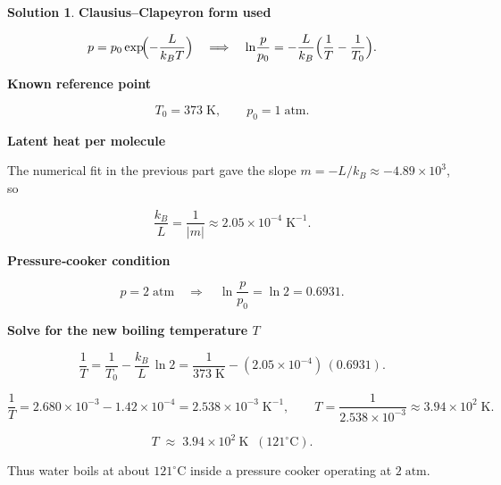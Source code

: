 \documentclass[12pt]{article}
\theoremstyle{definition} %
\newtheorem{solution}{Solution}
\theoremstyle{plain} %
\begin{document}
                      \begin{solution}
                        \textbf{Clausius–Clapeyron form used}
                        
                        \[
                        p = p_0 \exp\!\Bigl(-\frac{L}{k_B T}\Bigr)
                        \quad\Longrightarrow\quad
                        \ln\!\frac{p}{p_0} = -\frac{L}{k_B}\Bigl(\frac{1}{T}-\frac{1}{T_0}\Bigr).
                        \]
                        
                        \textbf{Known reference point}
                        
                        \[
                        T_0 = 373\;\text{K}, \qquad p_0 = 1\;\text{atm}.
                        \]
                        
                        \textbf{Latent heat per molecule}
                        
                        The numerical fit in the previous part gave the slope  
                        \(m = -L/k_B \approx -4.89\times10^{3}\),  
                        so
                        
                        \[
                        \frac{k_B}{L} = \frac{1}{|m|} \approx 2.05\times10^{-4}\;\text{K}^{-1}.
                        \]
                        
                        \textbf{Pressure‐cooker condition}
                        
                        \[
                        p = 2\;\text{atm}\quad\Longrightarrow\quad
                        \ln\!\frac{p}{p_0} = \ln 2 = 0.6931.
                        \]
                        
                        \textbf{Solve for the new boiling temperature \(T\)}
                        
                        \[
                        \frac{1}{T}
                          = \frac{1}{T_0} - \frac{k_B}{L}\,\ln 2
                          = \frac{1}{373\;\text{K}} - (2.05\times10^{-4})\,(0.6931).
                        \]
                        
                        \[
                        \frac{1}{T} = 2.680\times10^{-3} - 1.42\times10^{-4}
                                    = 2.538\times10^{-3}\;\text{K}^{-1},
                        \qquad
                        T = \frac{1}{2.538\times10^{-3}}
                          \approx 3.94\times10^{2}\;\text{K}.
                        \]
                        
                        \[
                        \boxed{T \;\approx\; 3.94\times10^{2}\ \text{K} \;\;(121^{\circ}\text{C})}.
                        \]
                        
                        Thus water boils at about \(121^{\circ}\text{C}\) inside a pressure cooker
                        operating at \(2\;\text{atm}\).
                        \end{solution}
\end{document}
